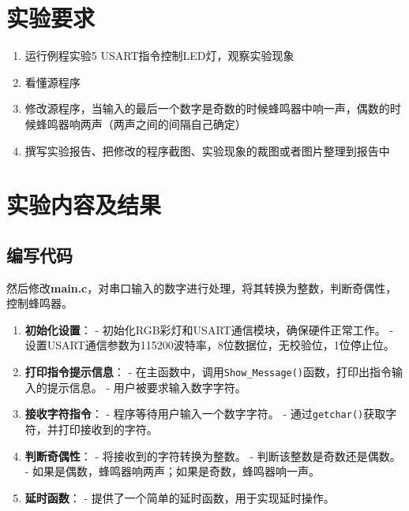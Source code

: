 \documentclass{math201}
\begin{document}

\makecover


\section{实验要求}

\begin{enumerate}
  \item 运行例程实验5 USART指令控制LED灯，观察实验现象
  \item 看懂源程序
  \item 修改源程序，当输入的最后一个数字是奇数的时候蜂鸣器中响一声，偶数的时候蜂鸣器响两声（两声之间的间隔自己确定）
  \item 撰写实验报告、把修改的程序截图、实验现象的裁图或者图片整理到报告中
\end{enumerate}

\section{实验内容及结果}

\subsection{编写代码}

然后修改\textbf{main.c}，对串口输入的数字进行处理，将其转换为整数，判断奇偶性，控制蜂鸣器。

\begin{enumerate}
  \item \textbf{初始化设置}：
    - 初始化RGB彩灯和USART通信模块，确保硬件正常工作。
    - 设置USART通信参数为115200波特率，8位数据位，无校验位，1位停止位。

  \item \textbf{打印指令提示信息}：
    - 在主函数中，调用\texttt{Show\_Message()}函数，打印出指令输入的提示信息。
    - 用户被要求输入数字字符。
  
  \item \textbf{接收字符指令}：
    - 程序等待用户输入一个数字字符。
    - 通过\texttt{getchar()}获取字符，并打印接收到的字符。

  \item \textbf{判断奇偶性}：
    - 将接收到的字符转换为整数。
    - 判断该整数是奇数还是偶数。
    - 如果是偶数，蜂鸣器响两声；如果是奇数，蜂鸣器响一声。

  \item \textbf{延时函数}：
    - 提供了一个简单的延时函数，用于实现延时操作。
\end{enumerate}
\end{document}
